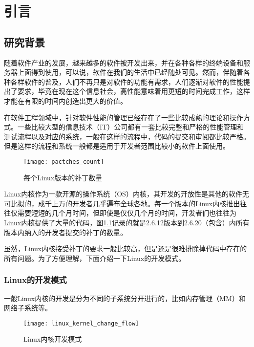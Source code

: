 
\chapter{引言}


\section{研究背景}

随着软件产业的发展，越来越多的软件被开发出来，并在各种各样的终端设备和服务器上面得到使用，可以说，软件在我们的生活中已经随处可见。然而，伴随着各种各样软件的普及，人们不再只是对软件的功能有需求，人们逐渐对软件的性能提出了要求，毕竟在现在这个信息社会，高性能意味着用更短的时间完成工作，这样才能在有限的时间内创造出更大的价值。

在软件工程领域中，针对软件性能的管理已经存在了一些比较成熟的理论和操作方式。一些比较大型的信息技术（IT）公司都有一套比较完整和严格的性能管理和测试流程以及对应的系统，一般在这样的流程中，代码的提交和审阅都比较严格。但是这样的流程和系统一般都是适用于开发者范围比较小的软件上面使用。

\begin{figure}[H]
\centering
\texttt{[image: pactches\_count]}
\caption{每个Linux版本的补丁数量\cite{chen2007keeping}}
\label{fig:patches_count}
\end{figure}

Linux内核作为一款开源的操作系统（OS）内核，其开发的开放性是其他的软件无可比拟的，成千上万的开发者几乎遍布全球各地。每一个版本的Linux内核推出往往仅需要短短的几个月时间，但即使是仅仅几个月的时间，开发者们也往往为Linux内核提供了大量的代码，图\ref{fig:patches_count}\cite{chen2007keeping}记录的就是2.6.12版本到2.6.20（包含）内所有版本内纳入的开发者提交的补丁的数量。

虽然，Linux内核接受补丁的要求一般比较高，但是还是很难排除掉代码中存在的所有问题。为了方便理解，下面介绍一下Linux的开发模式。


\subsection{Linux的开发模式}

一般Linux内核的开发是分为不同的子系统分开进行的，比如内存管理（MM）和网络子系统等。
\begin{figure}[H]
\centering
\texttt{[image: linux\_kernel\_change\_flow]}
\caption{Linux内核开发模式\cite{bligh2006fully}}
\label{fig:linux_kernel_change_flow}
\end{figure}

